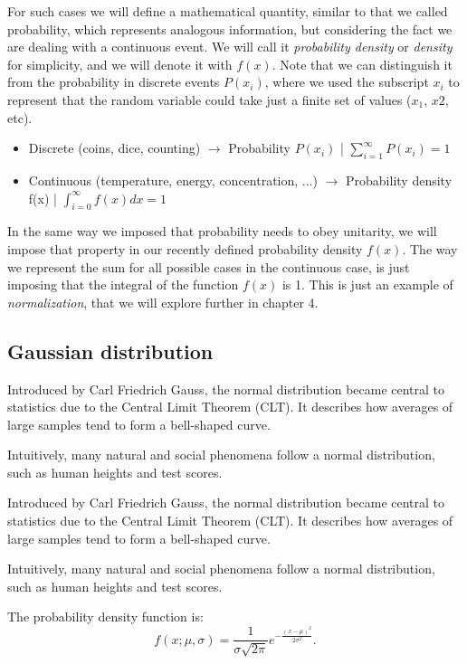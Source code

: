 \documentclass{book}
\begin{document}
For such cases we will define a mathematical quantity, similar to that we called probability, which represents analogous information, but considering the fact we are dealing with a continuous event. We will call it \textit{probability density} or \textit{density} for simplicity, and we will denote it with $f(x)$. Note that we can distinguish it from the probability in discrete events $P(x_{i})$, where we used the subscript $x_{i}$ to represent that the random variable could take just a finite set of values ($x_{1}$, $x{2}$, etc).

\begin{itemize}
\item Discrete (coins, dice, counting) $\longrightarrow$ Probability $P(x_{i})$ | $\sum_{i = 1}^{\infty} P(x_{i}) = 1$
\item Continuous (temperature, energy, concentration, ...) $\longrightarrow$ Probability density f(x) | $\int_{i = 0}^{\infty} f(x) dx = 1$
\end{itemize}

In the same way we imposed that probability needs to obey unitarity, we will impose that property in our recently defined probability density $f(x)$. The way we represent the sum for all possible cases in the continuous case, is just imposing that the integral of the function $f(x)$ is 1. This is just an example of \textit{normalization}, that we will explore further in chapter 4.

\newpage
\subsection{Gaussian distribution}
Introduced by Carl Friedrich Gauss, the normal distribution became central to statistics due to the Central Limit Theorem (CLT). It describes how averages of large samples tend to form a bell-shaped curve.

Intuitively, many natural and social phenomena follow a normal distribution, such as human heights and test scores.

Introduced by Carl Friedrich Gauss, the normal distribution became central to statistics due to the Central Limit Theorem (CLT). It describes how averages of large samples tend to form a bell-shaped curve.

Intuitively, many natural and social phenomena follow a normal distribution, such as human heights and test scores.

The probability density function is:
\begin{equation}
    f(x; \mu, \sigma) = \frac{1}{\sigma \sqrt{2\pi}} e^{-\frac{(x-\mu)^2}{2\sigma^2}}.
\end{equation}
\end{document}
